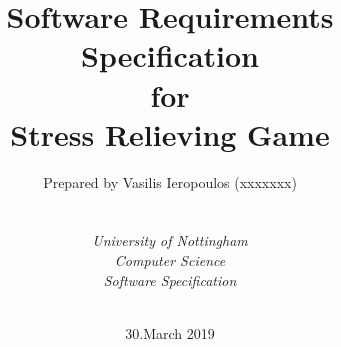 

\def\Institute{\textit{University of Nottingham}}
\def\Course{\textit{Computer Science}}
\def\Module{\textit{ Software Specification}}



\def\BoldTitle{Software Requirements Specification}

\def\Subtitle{for \\ Stress Relieving Game \\}
\def\Authors{Prepared by Vasilis Ieropoulos (xxxxxxx) } 
\def\Shortname{V.Ieropoulos}

\title{\textbf{\BoldTitle}\\\Subtitle}
\author{\Authors \\ \\ \\ \Institute\\ \Course\\ \Module\\ \Docent\\ \Assistant}
\date{30.March 2019}


